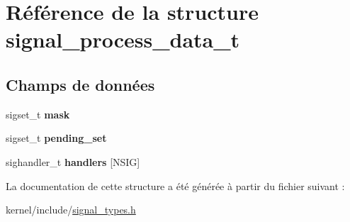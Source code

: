 \hypertarget{structsignal__process__data__t}{\section{Référence de la structure signal\-\_\-process\-\_\-data\-\_\-t}
\label{structsignal__process__data__t}
}
\subsection*{Champs de données}
\begin{DoxyCompactItemize}
\item 
\hypertarget{structsignal__process__data__t_a397d720abbb70447cb1837012fa808e8}{sigset\-\_\-t {\bfseries mask}}\label{structsignal__process__data__t_a397d720abbb70447cb1837012fa808e8}

\item 
\hypertarget{structsignal__process__data__t_a072dbf9762b10b9b8b545622fcbfef92}{sigset\-\_\-t {\bfseries pending\-\_\-set}}\label{structsignal__process__data__t_a072dbf9762b10b9b8b545622fcbfef92}

\item 
\hypertarget{structsignal__process__data__t_acfd78d7210d6b09d6ffcf8d5c0ed8c24}{sighandler\-\_\-t {\bfseries handlers} \mbox{[}N\-S\-I\-G\mbox{]}}\label{structsignal__process__data__t_acfd78d7210d6b09d6ffcf8d5c0ed8c24}

\end{DoxyCompactItemize}


La documentation de cette structure a été générée à partir du fichier suivant \-:\begin{DoxyCompactItemize}
\item 
kernel/include/\hyperlink{signal__types_8h}{signal\-\_\-types.\-h}\end{DoxyCompactItemize}
